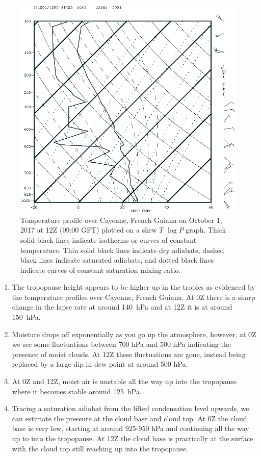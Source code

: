 \documentclass[11pt]{article}
\begin{document}
\begin{figure}[h!]
  \centering
  \includegraphics[width=\textwidth]{SOCAMoist12Z.png}
  \caption{Temperature profile over Cayenne, French Guiana on October 1, 2017 at 12Z (09:00 GFT) plotted on a skew $T$ $\log P$ graph. Thick solid black lines indicate isotherms or curves of constant temperature. Thin solid black lines indicate dry adiabats, dashed black lines indicate saturated adiabats, and dotted black lines indicate curves of constant saturation mixing ratio.}
  \label{fig:SOCA12Z}
\end{figure}

\begin{enumerate}
  \item The tropopause height appears to be higher up in the tropics as evidenced by the temperature profiles over Cayenne, French Guiana. At 0Z there is a sharp change in the lapse rate at around \SI{140}{\hecto\Pa} and at 12Z it is at around \SI{150}{\hecto\Pa}.
  \item Moisture drops off exponentially as you go up the atmosphere, however, at 0Z we see some fluctuations between 700 hPa and 500 hPa indicating the presence of moist clouds. At 12Z these fluctuations are gone, instead being replaced by a large dip in dew point at around 500 hPa.
  \item At 0Z and 12Z, moist air is unstable all the way up into the tropopause where it becomes stable around \SI{125}{\hecto\Pa}.
  \item Tracing a saturation adiabat from the lifted condensation level upwards, we can estimate the pressure at the cloud base and cloud top. At 0Z the cloud base is very low, starting at around 925-950 hPa and continuing all the way up to into the tropopause. At 12Z the cloud base is practically at the surface with the cloud top still reaching up into the tropopause.
\end{enumerate}
\end{document}
